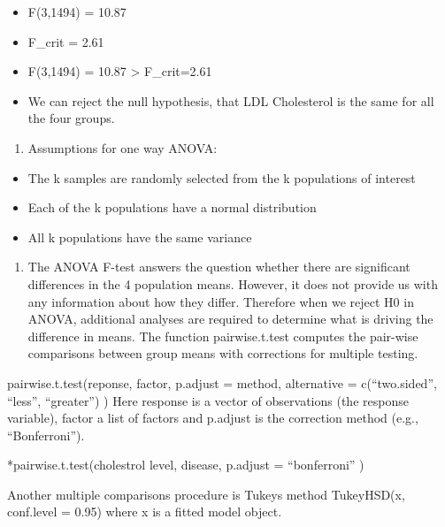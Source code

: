 \documentclass[]{article}
\providecommand{\tightlist}{%
  \setlength{\itemsep}{0pt}\setlength{\parskip}{0pt}}
\begin{document}
\begin{itemize}
\tightlist
\item
  F(3,1494) = 10.87
\item
  F\_crit = 2.61
\item
  F(3,1494) = 10.87 \textgreater{} F\_crit=2.61
\item
  We can reject the null hypothesis, that LDL Cholesterol is the same
  for all the four groups.
\end{itemize}

\begin{enumerate}
\def\labelenumi{\alph{enumi}.}
\setcounter{enumi}{2}
\tightlist
\item
  Assumptions for one way ANOVA:
\end{enumerate}

\begin{itemize}
\tightlist
\item
  The k samples are randomly selected from the k populations of interest
\item
  Each of the k populations have a normal distribution
\item
  All k populations have the same variance
\end{itemize}

\begin{enumerate}
\def\labelenumi{\alph{enumi}.}
\setcounter{enumi}{3}
\tightlist
\item
  The ANOVA F-test answers the question whether there are significant
  differences in the 4 population means. However, it does not provide us
  with any information about how they differ. Therefore when we reject
  H0 in ANOVA, additional analyses are required to determine what is
  driving the difference in means. The function pairwise.t.test computes
  the pair-wise comparisons between group means with corrections for
  multiple testing.
\end{enumerate}

pairwise.t.test(reponse, factor, p.adjust = method, alternative =
c(``two.sided'', ``less'', ``greater'') ) Here response is a vector of
observations (the response variable), factor a list of factors and
p.adjust is the correction method (e.g., ``Bonferroni'').

*pairwise.t.test(cholestrol level, disease, p.adjust = ``bonferroni'' )

Another multiple comparisons procedure is Tukeys method TukeyHSD(x,
conf.level = 0.95) where x is a fitted model object.

\newpage
\end{document}
